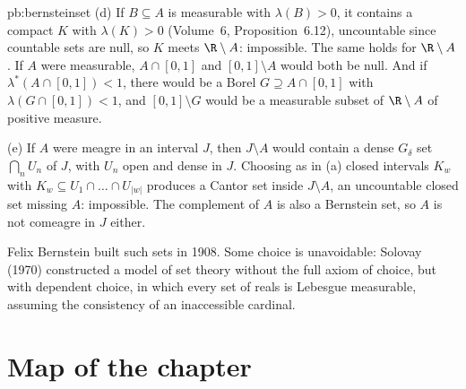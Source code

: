 \begin{solution}{pb:bernsteinset}
(d) If $B\subseteq A$ is measurable with $\lambda(B)>0$, it contains a compact $K$ with $\lambda(K)>0$ (Volume~6, Proposition~6.12), uncountable since countable sets are null,
so $K$ meets $\R\setminus A$: impossible. The same holds for $\R\setminus A$. If $A$ were measurable, $A\cap[0,1]$ and $[0,1]\setminus A$ would both be null. And if
$\lambda^*(A\cap[0,1])<1$, there would be a Borel $G\supseteq A\cap[0,1]$ with $\lambda(G\cap[0,1])<1$, and $[0,1]\setminus G$ would be a measurable subset of $\R\setminus A$ of
positive measure.

(e) If $A$ were meagre in an interval $J$, then $J\setminus A$ would contain a dense $G_\delta$ set $\bigcap_nU_n$ of $J$, with $U_n$ open and dense in $J$. Choosing as in (a)
closed intervals $K_w$ with $K_w\subseteq U_1\cap\dots\cap U_{|w|}$ produces a Cantor set inside $J\setminus A$, an uncountable closed set missing $A$: impossible. The
complement of $A$ is also a Bernstein set, so $A$ is not comeagre in $J$ either.

\leads Felix Bernstein built such sets in 1908. Some choice is unavoidable: Solovay (1970) constructed a model of set theory without the full axiom of choice, but
with dependent choice, in which every set of reals is Lebesgue measurable, assuming the consistency of an inaccessible cardinal.
\end{solution}

\section*{Map of the chapter}

